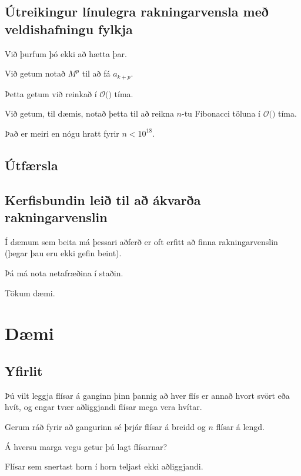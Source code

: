 \subsection{Útreikingur línulegra rakningarvensla með veldishafningu fylkja}
{
    {
        \item<1-> Við þurfum þó ekki að hætta þar.
        \item<2-> Við getum notað $M^p$ til að fá $a_{k + p}$.
        \item<3-> Þetta getum við reinkað í $\mathcal{O}($$)$ tíma.
        \item<5-> Við getum, til dæmis, notað þetta til að reikna $n$-tu Fibonacci töluna í $\mathcal{O}($$)$ tíma.
        \item<7-> Það er meiri en nógu hratt fyrir $n < 10^{18}$.
    }
}

\subsection{Útfærsla}
{
}

\subsection{Kerfisbundin leið til að ákvarða rakningarvenslin}
{
    {
        \item<1-> Í dæmum sem beita má þessari aðferð er oft erfitt að finna rakningarvenslin (þegar þau eru ekki gefin beint).
        \item<2-> Þá má nota netafræðina í staðin.
        \item<3-> Tökum dæmi.
    }
}

\section{Dæmi}
\subsection{Yfirlit}
{
    {
        \item<1-> Þú vilt leggja flísar á ganginn þinn þannig að hver flís er annað hvort svört eða hvít,
                    og engar tvær aðliggjandi flísar mega vera hvítar.
        \item<2-> Gerum ráð fyrir að gangurinn sé þrjár flísar á breidd og $n$ flísar á lengd.
        \item<3-> Á hversu marga vegu getur þú lagt flísarnar?
        \item<4-> Flísar sem snertast horn í horn teljast ekki aðliggjandi.
    }
}


